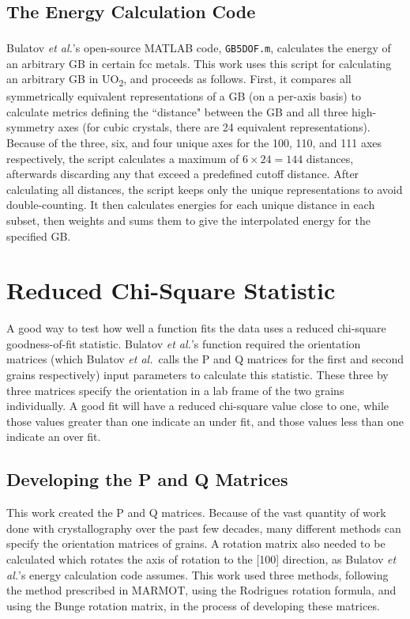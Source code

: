 \documentclass[12pt]{report}
\begin{document}
\subsection{The Energy Calculation Code\label{code:energyCalc}}
Bulatov \emph{et al.}'s open-source MATLAB\textsuperscript{\textregistered} code\cite{bulatov2014}, \lstinline!GB5DOF.m!, calculates the energy of an arbitrary GB in certain fcc metals. This work uses this script for calculating an arbitrary GB in UO\textsubscript{2}, and proceeds as follows.  First, it compares all symmetrically equivalent representations of a GB (on a per-axis basis) to calculate metrics defining the ``distance" between the GB and all three high-symmetry axes (for cubic crystals, there are 24 equivalent representations\cite{stokes2007}).  Because of the three, six, and four unique axes for the \textlangle{}100\textrangle{}, \textlangle{}110\textrangle{}, and \textlangle{}111\textrangle{} axes respectively, the script calculates a maximum of $6\times24=144$ distances, afterwards discarding any that exceed a predefined cutoff distance.  After calculating all distances, the script keeps only the unique representations to avoid double-counting.\cite{bulatov2014}  It then calculates energies for each unique distance in each subset, then weights and sums them to give the interpolated energy for the specified GB.

\section{Reduced Chi-Square Statistic\label{methods:chi2}}
A good way to test how well a function fits the data uses a reduced chi-square goodness-of-fit statistic.\cite{bevington2003}  Bulatov \emph{et al.}'s function required the orientation matrices (which Bulatov \emph{et al.}\ calls the P and Q matrices for the first and second grains respectively) input parameters to calculate this statistic.  These three by three matrices specify the orientation in a lab frame of the two grains individually. A good fit will have a reduced chi-square value close to one, while those values greater than one indicate an under fit, and those values less than one indicate an over fit.\cite{bevington2003}

\subsection{Developing the P and Q Matrices\label{chi2:PQ}}
This work created the P and Q matrices.  Because of the vast quantity of work done with crystallography over the past few decades, many different methods can specify the orientation matrices of grains. A rotation matrix also needed to be calculated which rotates the axis of rotation to the [100] direction, as Bulatov \emph{et al.}'s energy calculation code assumes.  This work used three methods, following the method prescribed in MARMOT, using the Rodrigues rotation formula, and using the Bunge rotation matrix, in the process of developing these matrices.
\end{document}
